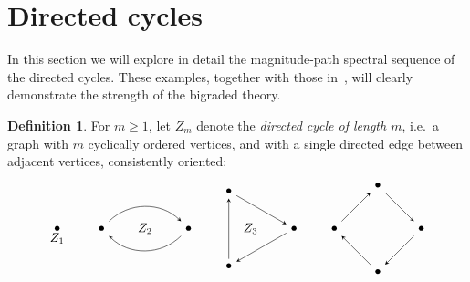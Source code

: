 \documentclass[a4paper, 11 pt, oneside, reqno]{amsart}
\numberwithin{lemma}{section}
\theoremstyle{definition}
\newtheorem{definition}[lemma]{Definition}
\begin{document}

\section{Directed cycles}\label{sec:directed_cycles}

In this section we will explore in detail the magnitude-path spectral 
sequence of the directed cycles.
These examples, together with those in~, 
will clearly demonstrate the strength of the  bigraded theory.

\begin{definition}
    For $m\geq 1$,
    let $Z_m$ denote the \emph{directed cycle of length
    $m$}, i.e.~a graph with $m$ cyclically ordered vertices,
    and with a single directed edge between adjacent vertices, 
    consistently oriented:
    \[
        \begin{tikzpicture}[baseline=0]
            \node (a) at (0:0) {$\bullet$};
            \node[below] () at (0:0) {$Z_1$};
        \end{tikzpicture}
        \qquad
        \begin{tikzpicture}[baseline=0]
            \node (a) at (0:1.2) {$\bullet$};
            \node (b) at (180:1.2) {$\bullet$};
    
            \draw[stealth-] (a) to [out=north west,in=north east] (b);
            \draw[stealth-] (b) to [out= south east, in=south west] (a);
    
            \node () at (0:0) {$Z_2$};
        \end{tikzpicture}
        \qquad
        \begin{tikzpicture}[baseline=0]
            \node (a) at (0:1.2) {$\bullet$};
            \node (b) at (120:1.2) {$\bullet$};
            \node (c) at (240:1.2) {$\bullet$};
    
            \draw[stealth-] (a) -- (b);
            \draw[stealth-] (b) -- (c);
            \draw[stealth-] (c) -- (a);
    
            \node () at (0:0) {$Z_3$};
        \end{tikzpicture}
        \qquad
        \begin{tikzpicture}[baseline=0]
            \node (a) at (0:1.2) {$\bullet$};
            \node (b) at (90:1.2) {$\bullet$};
            \node (c) at (180:1.2) {$\bullet$};
            \node (d) at (270:1.2) {$\bullet$};
    
            \draw[stealth-] (a) -- (b);
            \draw[stealth-] (b) -- (c);
            \draw[stealth-] (c) -- (d);
            \draw[stealth-] (d) -- (a);
    

\end{tikzpicture}\]
\end{definition}
\end{document}
